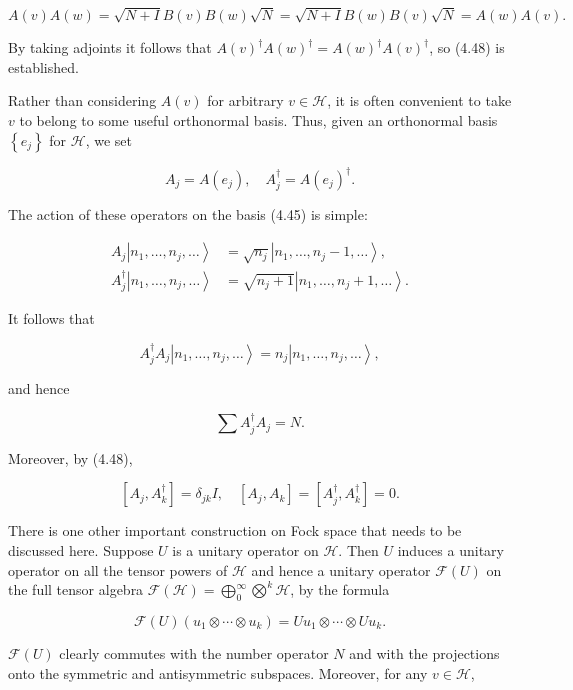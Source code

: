 \documentclass[10pt, letterpaper]{article}
\begin{document}
$$
A(v) A(w)=\sqrt{N+I} B(v) B(w) \sqrt{N}=\sqrt{N+I} B(w) B(v) \sqrt{N}=A(w) A(v) .
$$

By taking adjoints it follows that $A(v)^{\dagger} A(w)^{\dagger}=A(w)^{\dagger} A(v)^{\dagger}$, so (4.48) is established.

Rather than considering $A(v)$ for arbitrary $v \in \mathcal{H}$, it is often convenient to take $v$ to belong to some useful orthonormal basis. Thus, given an orthonormal basis $\left\{e_{j}\right\}$ for $\mathcal{H}$, we set

$$
A_{j}=A\left(e_{j}\right), \quad A_{j}^{\dagger}=A\left(e_{j}\right)^{\dagger} .
$$

The action of these operators on the basis (4.45) is simple:

$$
\begin{aligned}
A_{j}\left|n_{1}, \ldots, n_{j}, \ldots\right\rangle & =\sqrt{n_{j}}\left|n_{1}, \ldots, n_{j}-1, \ldots\right\rangle, \\
A_{j}^{\dagger}\left|n_{1}, \ldots, n_{j}, \ldots\right\rangle & =\sqrt{n_{j}+1}\left|n_{1}, \ldots, n_{j}+1, \ldots\right\rangle .
\end{aligned}
$$

It follows that

$$
A_{j}^{\dagger} A_{j}\left|n_{1}, \ldots, n_{j}, \ldots\right\rangle=n_{j}\left|n_{1}, \ldots, n_{j}, \ldots\right\rangle,
$$

and hence

$$
\sum A_{j}^{\dagger} A_{j}=N .
$$

Moreover, by (4.48),

$$
\left[A_{j}, A_{k}^{\dagger}\right]=\delta_{j k} I, \quad\left[A_{j}, A_{k}\right]=\left[A_{j}^{\dagger}, A_{k}^{\dagger}\right]=0 .
$$

There is one other important construction on Fock space that needs to be discussed here. Suppose $U$ is a unitary operator on $\mathcal{H}$. Then $U$ induces a unitary operator on all the tensor powers of $\mathcal{H}$ and hence a unitary operator $\mathcal{F}(U)$ on the full tensor algebra $\mathcal{F}(\mathcal{H})=\bigoplus_{0}^{\infty} \bigotimes^{k} \mathcal{H}$, by the formula

$$
\mathcal{F}(U)\left(u_{1} \otimes \cdots \otimes u_{k}\right)=U u_{1} \otimes \cdots \otimes U u_{k} .
$$

$\mathcal{F}(U)$ clearly commutes with the number operator $N$ and with the projections onto the symmetric and antisymmetric subspaces. Moreover, for any $v \in \mathcal{H}$,
\end{document}
